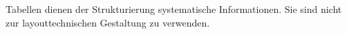 Tabellen dienen der Strukturierung systematische Informationen. Sie sind nicht
zur layouttechnischen Gestaltung zu verwenden.

